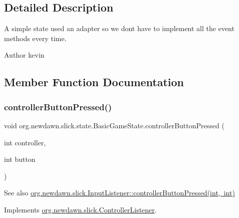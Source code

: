\subsection{Detailed Description}
A simple state used an adapter so we don\textquotesingle{}t have to implement all the event methods every time.

\begin{DoxyAuthor}{Author}
kevin 
\end{DoxyAuthor}


\subsection{Member Function Documentation}
\mbox{\label{classorg_1_1newdawn_1_1slick_1_1state_1_1_basic_game_state_ace9fde4bc57f608d957efc97667b8a6d}} 
\subsubsection{\texorpdfstring{controller\+Button\+Pressed()}{controllerButtonPressed()}}
{\footnotesize\ttfamily void org.\+newdawn.\+slick.\+state.\+Basic\+Game\+State.\+controller\+Button\+Pressed (\begin{DoxyParamCaption}\item[{int}]{controller,  }\item[{int}]{button }\end{DoxyParamCaption})\hspace{0.3cm}{\ttfamily [inline]}}

\begin{DoxySeeAlso}{See also}
\mbox{\hyperlink{interfaceorg_1_1newdawn_1_1slick_1_1_controller_listener_ae6feac165a8d0eded01f38de12f239ff}{org.\+newdawn.\+slick.\+Input\+Listener\+::controller\+Button\+Pressed(int, int)}} 
\end{DoxySeeAlso}


Implements \mbox{\hyperlink{interfaceorg_1_1newdawn_1_1slick_1_1_controller_listener_ae6feac165a8d0eded01f38de12f239ff}{org.\+newdawn.\+slick.\+Controller\+Listener}}.


